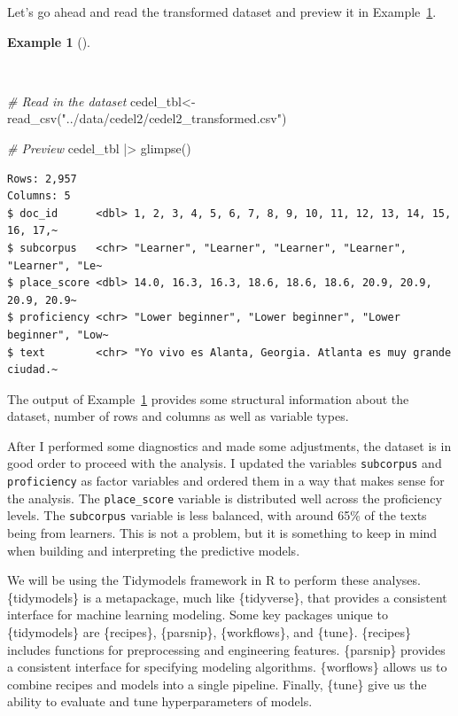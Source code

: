 \documentclass[
  letterpaper,
  krantz1]{latex/krantz-mod}
\newenvironment{Shaded}{\begin{snugshade}}{\end{snugshade}}
\newcommand{\CommentTok}[1]{\textcolor[rgb]{0.00,0.00,0.00}{\textit{#1}}}
\newcommand{\FunctionTok}[1]{\textcolor[rgb]{0.00,0.00,0.00}{#1}}
\newcommand{\NormalTok}[1]{\textcolor[rgb]{0.00,0.00,0.00}{#1}}
\newcommand{\OtherTok}[1]{\textcolor[rgb]{0.00,0.00,0.00}{#1}}
\newcommand{\SpecialCharTok}[1]{\textcolor[rgb]{0.00,0.00,0.00}{#1}}
\newcommand{\StringTok}[1]{\textcolor[rgb]{0.00,0.00,0.00}{#1}}
\theoremstyle{definition}
\newtheorem{example}{Example}[chapter]
\theoremstyle{definition}
\theoremstyle{remark}
\begin{document}
Let's go ahead and read the transformed dataset and preview it in
Example~\ref{exm-predict-cedel-read}.

\begin{example}[]\protect\hypertarget{exm-predict-cedel-read}{}\label{exm-predict-cedel-read}

~

\begin{Shaded}
\begin{Highlighting}[numbers=left,,]
\CommentTok{\# Read in the dataset}
\NormalTok{cedel\_tbl}\OtherTok{\textless{}{-}}
  \FunctionTok{read\_csv}\NormalTok{(}\StringTok{"../data/cedel2/cedel2\_transformed.csv"}\NormalTok{)}

\CommentTok{\# Preview}
\NormalTok{cedel\_tbl }\SpecialCharTok{|\textgreater{}} \FunctionTok{glimpse}\NormalTok{()}
\end{Highlighting}
\end{Shaded}

\begin{verbatim}
Rows: 2,957
Columns: 5
$ doc_id      <dbl> 1, 2, 3, 4, 5, 6, 7, 8, 9, 10, 11, 12, 13, 14, 15, 16, 17,~
$ subcorpus   <chr> "Learner", "Learner", "Learner", "Learner", "Learner", "Le~
$ place_score <dbl> 14.0, 16.3, 16.3, 18.6, 18.6, 18.6, 20.9, 20.9, 20.9, 20.9~
$ proficiency <chr> "Lower beginner", "Lower beginner", "Lower beginner", "Low~
$ text        <chr> "Yo vivo es Alanta, Georgia. Atlanta es muy grande ciudad.~
\end{verbatim}

\end{example}

The output of Example~\ref{exm-predict-cedel-read} provides some
structural information about the dataset, number of rows and columns as
well as variable types.

After I performed some diagnostics and made some adjustments, the
dataset is in good order to proceed with the analysis. I updated the
variables \texttt{subcorpus} and \texttt{proficiency} as factor
variables and ordered them in a way that makes sense for the analysis.
The \texttt{place\_score} variable is distributed well across the
proficiency levels. The \texttt{subcorpus} variable is less balanced,
with around 65\% of the texts being from learners. This is not a
problem, but it is something to keep in mind when building and
interpreting the predictive models.

We will be using the Tidymodels framework in R to perform these
analyses. \{tidymodels\} is a metapackage, much like \{tidyverse\}, that
provides a consistent interface for machine learning modeling. Some key
packages unique to \{tidymodels\} are \{recipes\}, \{parsnip\},
\{workflows\}, and \{tune\}. \{recipes\} includes functions for
preprocessing and engineering features. \{parsnip\} provides a
consistent interface for specifying modeling algorithms. \{worflows\}
allows us to combine recipes and models into a single pipeline. Finally,
\{tune\} give us the ability to evaluate and tune hyperparameters of
models.
\end{document}

